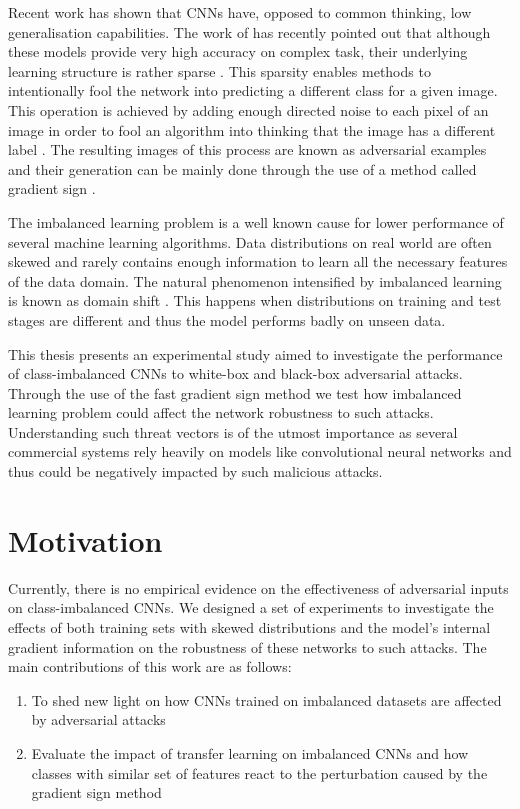 Recent work has shown that CNNs have, opposed to common thinking, low generalisation capabilities. The work of \cite{goodfellow2014} has recently pointed out that although these models provide very high accuracy on complex task, their underlying learning structure is rather sparse \cite{papernot2016}. This sparsity enables methods to intentionally fool the network into predicting a different class for a given image. This operation is achieved by adding enough directed noise to each pixel of an image in order to fool an algorithm into thinking that the image has a different label \cite{goodfellow2014, papernot2016transf,goodfellow2016, szegedy2013}. The resulting images of this process are known as adversarial examples and their generation can be mainly done through the use of a method called gradient sign \cite{goodfellow2014}.

The imbalanced learning problem is a well known cause for lower performance of several machine learning algorithms. Data distributions on real world  are often skewed and rarely contains enough information to learn all the necessary features of the data domain. The natural phenomenon intensified by imbalanced learning is known as domain shift \cite{Quionero}. This happens when distributions on training and test stages are different and thus the model performs badly on unseen data.

This thesis presents an experimental study aimed to investigate the performance of class-imbalanced CNNs to white-box and black-box adversarial attacks. Through the use of the fast gradient sign method we test how imbalanced learning problem could affect the network robustness to such attacks. Understanding such threat vectors is of the utmost importance as several commercial systems rely heavily on models like convolutional neural networks and thus could be negatively impacted by such malicious attacks.


\section{Motivation}

Currently, there is no empirical evidence on the effectiveness of adversarial inputs on class-imbalanced CNNs. We designed a set of experiments to investigate the effects of both training sets with skewed distributions and the model's internal gradient information on the robustness of these networks to such attacks. The main contributions of this work are as follows: 
\begin{enumerate}
	\item To shed new light on how CNNs trained on imbalanced datasets are affected by adversarial attacks
	\item Evaluate the impact of transfer learning on imbalanced CNNs and how classes with similar set of features react to the perturbation caused by the gradient sign method
\end{enumerate}

